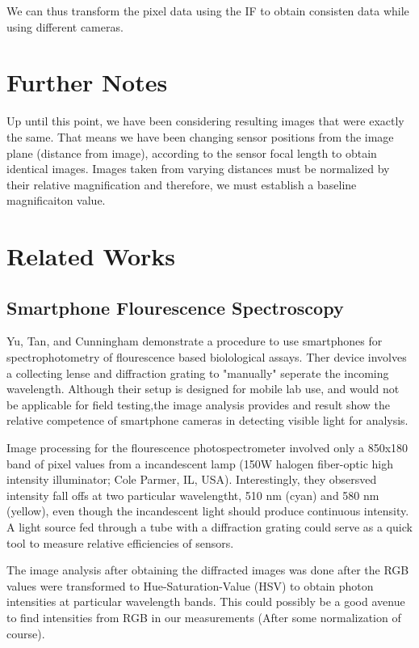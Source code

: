 \documentclass{article}
\begin{document}
We can thus transform the pixel data using the IF to obtain consisten data while using
different cameras.
\section{Further Notes}

Up until this point, we have been considering resulting images that were exactly the same. That means
we have been changing sensor positions from the image plane (distance from image), according to the
sensor focal length to obtain identical images. Images taken from varying distances must be normalized
by their relative magnification and therefore, we must establish a baseline magnificaiton value.


\section{Related Works}

\subsection{Smartphone Flourescence Spectroscopy}
Yu, Tan, and Cunningham demonstrate a procedure to use smartphones for
spectrophotometry of flourescence based biolological assays. Ther device
involves a collecting lense and diffraction grating to "manually" seperate
the incoming wavelength. Although their setup is designed for mobile lab use, and
would not be applicable for field testing,the image analysis provides and result show
the relative competence of smartphone cameras in detecting visible light for analysis.

Image processing for the flourescence photospectrometer involved only a 850x180 band of pixel
values from a incandescent lamp (150W halogen fiber-optic high intensity illuminator; Cole Parmer, IL, USA).
Interestingly, they obsersved intensity fall offs at two particular wavelengtht, 510 nm (cyan) and 580 nm (yellow),
even though the incandescent light should produce continuous intensity. A light
source fed through a tube with a diffraction grating could serve as a quick tool to
measure relative efficiencies of sensors.

The image analysis after obtaining the diffracted images was done after the RGB values
were transformed to Hue-Saturation-Value (HSV) to obtain photon intensities at
particular wavelength bands. This could possibly be a good avenue to find intensities
from RGB in our measurements (After some normalization of course).
\end{document}
